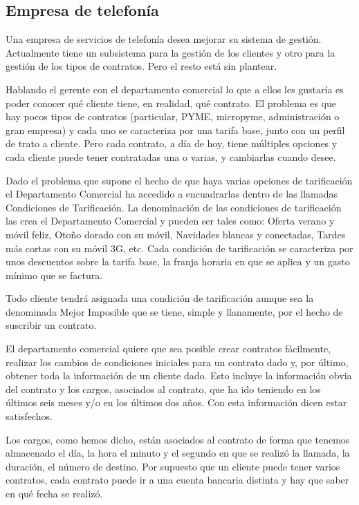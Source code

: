 \documentclass{db-practice}
\begin{document}
\subsection{Empresa de telefonía}

Una empresa de servicios de telefonía desea mejorar su sistema de gestión. Actualmente tiene un subsistema para la gestión de los clientes y otro para la gestión de los tipos de contratos. Pero el resto está sin plantear. 

Hablando el gerente con el departamento comercial lo que a ellos les gustaría es poder conocer qué cliente tiene, en realidad, qué contrato. El problema es que hay pocos tipos de contratos (particular, PYME, micropyme, administración o gran empresa) y cada uno se caracteriza por una tarifa base, junto con un perfil de trato a cliente. Pero cada contrato, a día de hoy, tiene múltiples opciones y cada cliente puede tener contratadas una o varias, y cambiarlas cuando desee. 

Dado el problema que supone el hecho de que haya varias opciones de tarificación el Departamento Comercial ha accedido a encuadrarlas dentro de las llamadas Condiciones de Tarificación. La denominación de las condiciones de tarificación las crea el Departamento Comercial y pueden ser tales como: Oferta verano y móvil feliz, Otoño dorado con su móvil, Navidades blancas y conectadas, Tardes más cortas con su móvil 3G, etc. Cada condición de tarificación se caracteriza por unos descuentos sobre la tarifa base, la franja horaria en que se aplica y un gasto mínimo que se factura. 

Todo cliente tendrá asignada una condición de tarificación aunque sea la denominada Mejor Imposible que se tiene, simple y llanamente, por el hecho de suscribir un contrato.

El departamento comercial quiere que sea posible crear contratos fácilmente, realizar los cambios de condiciones iniciales para un contrato dado y, por último, obtener toda la información de un cliente dado. Esto incluye la información obvia del contrato y los cargos, asociados al contrato, que ha ido teniendo en los últimos seis meses y/o en los últimos dos años. Con esta información dicen estar satisfechos. 

Los cargos, como hemos dicho, están asociados al contrato de forma que tenemos almacenado el día, la hora el minuto y el segundo en que se realizó la llamada, la duración, el número de destino. Por supuesto que un cliente puede tener varios contratos, cada contrato puede ir a una cuenta bancaria distinta y hay que
saber en qué fecha se realizó.
\end{document}
